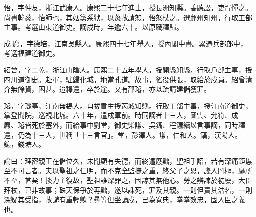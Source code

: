 \begin{pinyinscope}
怡，字仲友，浙江武康人。康熙二十七年進士，授長洲知縣。善聽訟，吏胥憚之。尚書韓菼，怡師也，其姻黨系獄，以菼故請恕，怡怒杖之。選鄜州知州，行取工部主事。考選山東道御史。謫戍時，年逾六十。以原職釋歸。

成麃，字德培，江南吳縣人。康熙四十七年舉人，授內閣中書。累遷兵部郎中，考選福建道御史。

紹曾，字二乾，浙江山陰人。康熙二十五年舉人，授開縣知縣。行取戶部主事，授四川道御史。赴軍，駐歸化城，地當孔道。故事，徭役供張，取給於戍員。紹曾清介無餘資，困甚。迨釋還，卒於途。又有邵璿，亦以疏請建儲獲罪。

璿，字璣亭，江南無錫人。自拔貢生授芮城知縣。行取工部主事，授江南道御史，掌登聞院，巡視北城。六十年，遣戍軍前。時同謫者十三人，圖雲、允符、成麃、璿皆死於塞外，而給事中劉堂，御史柴謙、吳鎬、程鑣續以言事謫，同時釋還，仍為十三人，世稱「十三言官」。堂，彭澤人。謙，仁和人。鎬，漢陽人。鑣，錢塘人。

論曰：理密親王在儲位久，未聞顯有失德，而終遭廢黜，聖祖手詔，若有深痛鉅慝至不可言者。夫以聖祖之仁明，而不克全監撫之重，終父子之恩，讒人罔極，靡所不至，甚矣！掞力主復故，聖祖雖深罪之，固諒其無他心。勞之辨諫於初廢，大臣拜杖，已非故事；硃天保爭於再黜，遂以誅死，罪及其親。一則但責其沽名，一則深疑其受指，故譴有重輕歟？彞等但坐謫戍，已為寬典，拳拳效忠，固人臣之義也。


\end{pinyinscope}